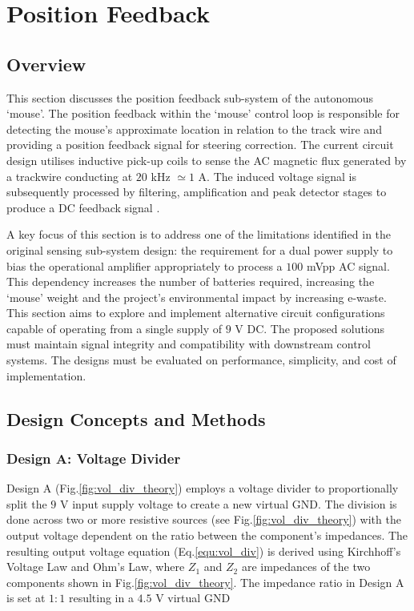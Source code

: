 \chapter{Position Feedback}
\section{Overview}
This section discusses the position feedback sub-system of the autonomous `mouse'. The position feedback within the `mouse' control loop is responsible for detecting the mouse's approximate location in relation to the track wire and providing a position feedback signal for steering correction. The current circuit design utilises inductive pick-up coils to sense the AC magnetic flux generated by a trackwire conducting at \(20\) kHz \(\simeq1\) A. The induced voltage signal is subsequently processed by filtering, amplification and peak detector stages to produce a DC feedback signal \cite{Robinson2025}.

A key focus of this section is to address one of the limitations identified in the original sensing sub-system design: the requirement for a dual power supply to bias the operational amplifier appropriately to process a \(100\) mVpp AC signal. This dependency increases the number of batteries required, increasing the `mouse' weight and the project's environmental impact by increasing e-waste. This section aims to explore and implement alternative circuit configurations capable of operating from a single supply of \(9\) V DC. The proposed solutions must maintain signal integrity and compatibility with downstream control systems. The designs must be evaluated on performance, simplicity, and cost of implementation.

\section{Design Concepts and Methods}

\subsection{Design A: Voltage Divider}
Design A (Fig.\ref{fig:vol_div_theory}) employs a voltage divider to proportionally split the \(9\) V input supply voltage to create a new virtual GND. The division is done across two or more resistive sources (see Fig.\ref{fig:vol_div_theory}) with the output voltage dependent on the ratio between the component's impedances. The resulting output voltage equation (Eq.\ref{equ:vol_div}) is derived using Kirchhoff's Voltage Law and Ohm's Law, where \(Z_1\) and \(Z_2\) are impedances of the two components shown in Fig.\ref{fig:vol_div_theory}. The impedance ratio in Design A is set at \(1:1\) resulting in a \(4.5\) V virtual GND

